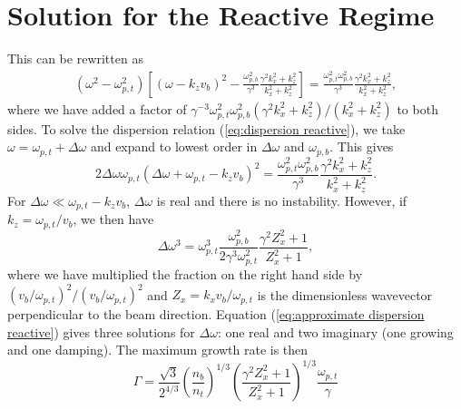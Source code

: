 \documentclass[usenatbib,iop,apj,numberedappendix]{aeb_emulateapj_2010}
\newcommand{\dbetabarLABpara}{\ensuremath{\overline{\Delta\beta^2}_{\rm L, \parallel}}}
\newcommand{\dbetabarCMpara}{\ensuremath{\overline{\Delta\beta^2}_{\rm CM, \parallel}}}
\begin{document}
%
%

\section{Solution for the Reactive Regime}\label{sec:solution reactive}

This can be rewritten as 
\begin{eqnarray}\label{eq:dispersion reactive}
 \left(\omega^2 - \omega_{p,t}^2\right)\left[\left(\omega - k_z v_b\right)^2 - \frac{\omega_{p,b}^2}{\gamma^3}\frac{\gamma^2 k_x^2 + k_z^2}{k_x^2 + k_z^2}\right] = \frac{\omega_{p,t}^2\omega_{p,b}^2}{\gamma^3}\frac{\gamma^2 k_x^2 + k_z^2}{k_x^2 + k_z^2},
\end{eqnarray}
where we have added a factor of $\gamma^{-3}\omega_{p,t}^2\omega_{p,b}^2({\gamma^2 k_x^2 + k_z^2})/({k_x^2 + k_z^2})$ to both sides. 
To solve the dispersion relation (\ref{eq:dispersion reactive}), we take $\omega = \omega_{p,t} + \Delta\omega$ and expand to lowest order in
$\Delta\omega$ and $\omega_{p,b}$.  This gives
\begin{equation}
 2\Delta\omega\omega_{p,t}\left(\Delta\omega + \omega_{p,t} - k_z v_b\right)^2 = \frac{\omega_{p,t}^2\omega_{p,b}^2}{\gamma^3}\frac{\gamma^2 k_x^2 + k_z^2}{k_x^2 + k_z^2}.
\end{equation}\label{eq:expanded dispersion reactive}
For $\Delta\omega \ll \omega_{p,t} - k_z v_b$, $\Delta\omega$ is real and there is no instability.  However, if $k_z = \omega_{p,t}/v_b$, we then have
\begin{equation}\label{eq:approximate dispersion reactive}
 \Delta\omega^3 = \omega_{p,t}^3\frac{\omega_{p,b}^2}{2\gamma^3\omega_{p,t}^2}\frac{\gamma^2 Z_x^2 + 1}{Z_x^2 + 1},
\end{equation}
where we have multiplied the fraction on the right hand side by $(v_b/\omega_{p,t})^2/(v_b/\omega_{p,t})^2$ and $Z_x = k_xv_b/\omega_{p,t}$ is the dimensionless wavevector perpendicular to the beam direction.  
Equation (\ref{eq:approximate dispersion reactive}) gives three solutions for $\Delta\omega$: one real and two imaginary (one growing and one damping).  The maximum growth rate is then
\begin{equation}\label{eq:growth rate reactive appendix}
 \Gamma = \frac{\sqrt{3}}{2^{4/3}}\left(\frac{n_b}{n_t}\right)^{1/3}\left(\frac{\gamma^2 Z_x^2 + 1}{Z_x^2 + 1}\right)^{1/3}\frac{\omega_{p,t}}{\gamma}
\end{equation}
\end{document}
